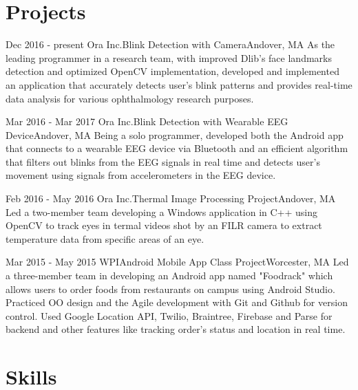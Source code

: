 \documentclass[12pt,a4paper,merriweather]{moderncv}        %
\begin{document}
\section{Projects}

\cventry
{Dec 2016 - present}
{Ora Inc.}{Blink Detection with Camera}{Andover, MA}{}
{As the leading programmer in a research team, with improved Dlib's face landmarks detection and optimized OpenCV implementation, developed and implemented an application that accurately detects user's blink patterns and provides real-time data analysis for various ophthalmology research purposes.}
\vspace{.15cm}

\cventry
{Mar 2016 - Mar 2017}
{Ora Inc.}{Blink Detection with Wearable EEG Device}{Andover, MA}{}
{Being a solo programmer, developed both the Android app that connects to a wearable EEG device via Bluetooth and an efficient algorithm that filters out blinks from the EEG signals in real time and detects user's movement using signals from accelerometers in the EEG device.}
\vspace{.15cm}

\cventry
{Feb 2016 - May 2016}
{Ora Inc.}{Thermal Image Processing Project}{Andover, MA}{}
{Led a two-member team developing a Windows application in C++ using OpenCV to track eyes in termal videos shot by an FILR camera to extract temperature data from specific areas of an eye. }
\vspace{.15cm}

\cventry
{Mar 2015 - May 2015}
{WPI}{Android Mobile App Class Project}{Worcester, MA}{}
{Led a three-member team in developing an Android app named "Foodrack" which allows users to order foods from restaurants on campus using Android Studio. Practiced OO design and the Agile development with Git and Github for version control. Used Google Location API, Twilio, Braintree, Firebase and Parse for backend and other features like tracking order's status and location in real time. }
\vspace{.15cm}


\section{Skills}
\end{document}
